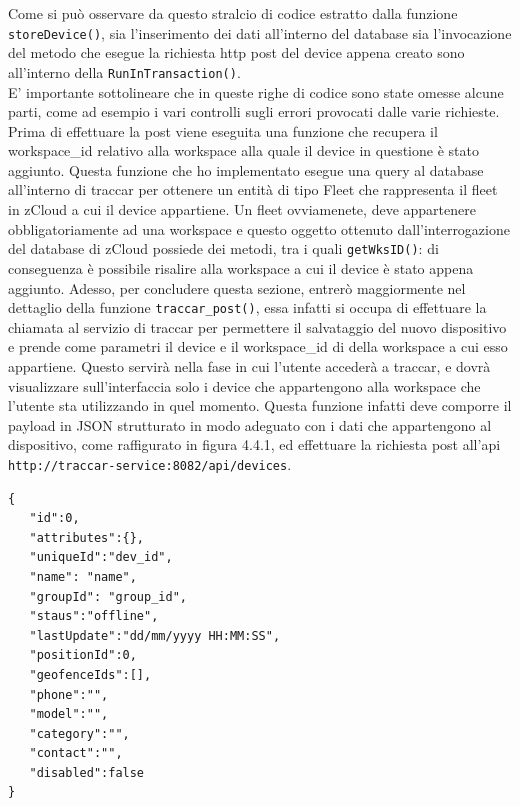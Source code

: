 \documentclass[a4paper,titlepage,12pt]{book}
\begin{document}
\noindent Come si può osservare da questo stralcio di codice estratto dalla funzione \texttt{storeDevice()}, sia l'inserimento dei dati all'interno del database sia l'invocazione del metodo che esegue la richiesta http post del device appena creato sono all'interno della \texttt{RunInTransaction()}.\\
E' importante sottolineare che in queste righe di codice sono state omesse alcune parti, come ad esempio i vari controlli sugli errori provocati dalle varie richieste.\\
Prima di effettuare la post viene eseguita una funzione che recupera il workspace\_id relativo alla workspace alla quale il device in questione è stato aggiunto. Questa funzione che ho implementato esegue una query al database all'interno di traccar per ottenere un entità di tipo Fleet che rappresenta il fleet in zCloud a cui il device appartiene. Un fleet ovviamenete, deve appartenere obbligatoriamente ad una workspace e questo oggetto ottenuto dall'interrogazione del database di zCloud possiede dei metodi, tra i quali \texttt{getWksID()}: di conseguenza è possibile risalire alla workspace a cui il device è stato appena aggiunto.
Adesso, per concludere questa sezione, entrerò maggiormente nel dettaglio della funzione \texttt{traccar\_post()}, essa infatti si occupa di effettuare la chiamata al servizio di traccar per permettere il salvataggio del nuovo dispositivo e prende come parametri il device e il workspace\_id di della workspace a cui esso appartiene. Questo servirà nella fase in cui l'utente accederà a traccar, e dovrà visualizzare sull'interfaccia solo i device che appartengono alla workspace che l'utente sta utilizzando in quel momento. Questa funzione infatti deve comporre il payload in JSON strutturato in modo adeguato con i dati che appartengono al dispositivo, come raffigurato in figura 4.4.1, ed effettuare la richiesta post all'api \texttt{http://traccar-service:8082/api/devices}.

\begin{verbatim}
{
   "id":0,
   "attributes":{},
   "uniqueId":"dev_id",
   "name": "name",
   "groupId": "group_id",
   "staus":"offline",
   "lastUpdate":"dd/mm/yyyy HH:MM:SS",
   "positionId":0,
   "geofenceIds":[],
   "phone":"",
   "model":"",
   "category":"",
   "contact":"",
   "disabled":false
}

\end{verbatim}
\end{document}
